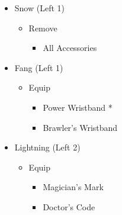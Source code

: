 \begin{menu}
\begin{multicols}{2}
\begin{itemize}
\begin{itemize}
\begin{itemize}
\begin{itemize}
            \end{itemize}
        \end{itemize}
        \item Snow (Left 1)
        \begin{itemize}
            \item Remove
            \begin{itemize}
                \item All Accessories
            \end{itemize}
        \end{itemize}
        \item Fang (Left 1)
        \begin{itemize}
            \item Equip
            \begin{itemize}
                \item Power Wristband *
                \item Brawler's Wristband
            \end{itemize}
        \end{itemize}
        \item Lightning (Left 2)
        \begin{itemize}
            \item Equip
            \begin{itemize}
                \item Magician's Mark
                \item Doctor's Code
            \end{itemize}
        \end{itemize}
    \end{itemize}
\end{itemize}
\end{multicols}
\end{menu}
\renewcommand{\fourth}{[4] Relentless Assault (\rav/\rav/\com)}
\renewcommand{\fifth}{[5] Aggression (\com/\rav/\com)}
